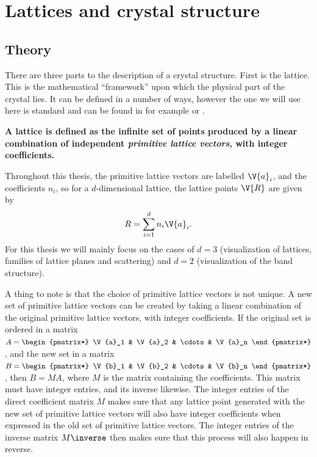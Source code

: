 \documentclass[main.tex]{subfiles}
\begin{document}
	\section{Lattices and crystal structure} \label{sec:lattice}
	\subsection{Theory} \label{sec:lattice_theory}
	There are three parts to the description of a crystal structure. First is the lattice. This is the mathematical ``framework'' upon which the physical part of the crystal lies. It can be defined in a number of ways, however the one we will use here is standard and can be found in for example \cite{simon} or \cite{kittel}.
	
	\textbf{A lattice is defined as the infinite set of points produced by a linear combination of independent \emph{primitive lattice vectors}, with integer coefficients.}
	
	Throughout this thesis, the primitive lattice vectors are labelled $ \V{a}_i $, and the coefficients $ n_i $, so for a $ d $-dimensional lattice, the lattice points $ \V{R} $ are given by
	\begin{equation}\label{eq:lattice_points}
	R = \sum_{i = 1}^{d} n_i \V{a}_i.
	\end{equation}
	For this thesis we will mainly focus on the cases of $ d = 3 $ (visualization of lattices, families of lattice planes and scattering) and $ d = 2 $ (visualization of the band structure).
	
	A thing to note is that the choice of primitive lattice vectors is not unique. A new set of primitive lattice vectors can be created by taking a linear combination of the original primitive lattice vectors, with integer coefficients. If the original set is ordered in a matrix $ A = \begin{pmatrix*} \V{a}_1 & \V{a}_2 & \cdots & \V{a}_n \end{pmatrix*}$, and the new set in a matrix $ B = \begin{pmatrix*} \V{b}_1 & \V{b}_2 & \cdots & \V{b}_n \end{pmatrix*} $, then $ B = MA $, where $ M $ is the matrix containing the coefficients. This matrix must have integer entries, and its inverse likewise. The integer entries of the direct coefficient matrix $ M $ makes sure that any lattice point generated with the new set of primitive lattice vectors will also have integer coefficients when expressed in the old set of primitive lattice vectors. The integer entries of the inverse matrix $ M\inverse $ then makes sure that this process will also happen in reverse.
	
\end{document}
